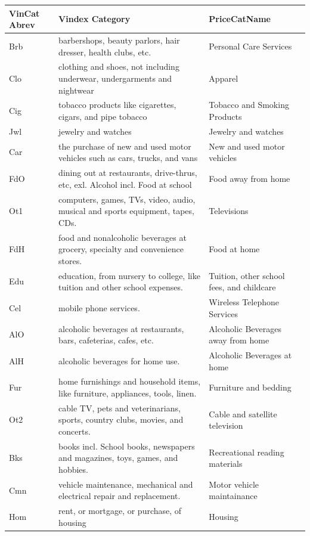 \documentclass{article}
\begin{document}
\begin{sideways}
\begin{tabular}{|l|l|l|}
\hline
VinCat Abrev & Vindex Category & PriceCatName\\ 
\hline
Brb & barbershops, beauty parlors, hair dresser, health clubs, etc. & Personal Care Services\\ 
\hline
Clo & clothing and shoes, not including underwear, undergarments and nightwear & Apparel\\ 
\hline
Cig & tobacco products like cigarettes, cigars, and pipe tobacco & Tobacco and Smoking Products\\ 
\hline
Jwl & jewelry and watches & Jewelry and watches\\ 
\hline
Car & the purchase of new and used motor vehicles such as cars, trucks, and vans & New and used motor vehicles\\ 
\hline
FdO & dining out at restaurants, drive-thrus, etc, exl. Alcohol incl. Food at school & Food away from home\\ 
\hline
Ot1 & computers, games, TVs, video, audio, musical and sports equipment, tapes, CDs. & Televisions\\ 
\hline
FdH & food and nonalcoholic beverages at grocery, specialty and convenience stores. & Food at home\\ 
\hline
Edu & education, from nursery to college, like tuition and other school expenses. & Tuition, other school fees, and childcare\\ 
\hline
Cel & mobile phone services. & Wireless Telephone Services\\ 
\hline
AlO & alcoholic beverages at restaurants, bars, cafeterias, cafes, etc. & Alcoholic Beverages away from home\\ 
\hline
AlH & alcoholic beverages for home use. & Alcoholic Beverages at home\\ 
\hline
Fur & home furnishings and household items, like furniture, appliances, tools, linen. & Furniture and bedding\\ 
\hline
Ot2 & cable TV, pets and veterinarians, sports, country clubs, movies, and concerts. & Cable and satellite television\\ 
\hline
Bks & books incl. School books, newspapers and magazines, toys, games, and hobbies. & Recreational reading materials\\ 
\hline
Cmn & vehicle maintenance, mechanical and electrical repair and replacement. & Motor vehicle maintainance\\ 
\hline
Hom & rent, or mortgage, or purchase, of housing & Housing\\ 

\end{tabular}
\end{sideways}
\end{document}
